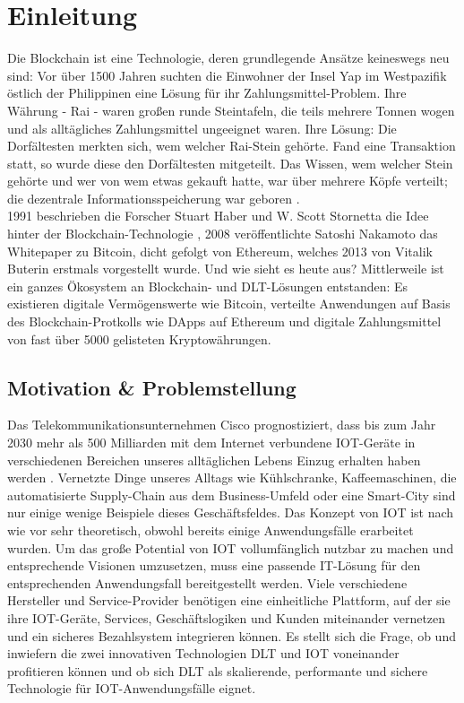 \chapter{Einleitung}
\label{ch:intro}
Die Blockchain ist eine Technologie, deren grundlegende Ansätze keineswegs neu sind: Vor über 1500 Jahren suchten die Einwohner der Insel Yap im Westpazifik östlich der Philippinen eine Lösung für ihr Zahlungsmittel-Problem. Ihre Währung - Rai - waren großen runde Steintafeln, die teils mehrere Tonnen wogen und als alltägliches Zahlungsmittel ungeeignet waren. Ihre Lösung: Die Dorfältesten merkten sich, wem welcher Rai-Stein gehörte. Fand eine Transaktion statt, so wurde diese den Dorfältesten mitgeteilt. Das Wissen, wem welcher Stein gehörte und wer von wem etwas gekauft hatte, war über mehrere Köpfe verteilt; die dezentrale Informationsspeicherung war geboren \cite{forbes2018}.\\
1991 beschrieben die Forscher Stuart Haber und W. Scott Stornetta die Idee hinter der Blockchain-Technologie \cite{binance2019}, 2008 veröffentlichte Satoshi Nakamoto das Whitepaper zu Bitcoin, dicht gefolgt von Ethereum, welches 2013 von Vitalik Buterin erstmals vorgestellt wurde. Und wie sieht es heute aus? Mittlerweile ist ein ganzes Ökosystem an Block\-chain- und \ac{DLT}-Lösungen entstanden: Es existieren digitale Vermögenswerte wie Bitcoin, verteilte Anwendungen auf Basis des Blockchain-Protkolls wie \ac{DApp}s auf Ethereum und digitale Zahlungsmittel von fast über 5000 gelisteten Kryptowährungen.\\


%
%
\section{Motivation \& Problemstellung}
\label{sec:intro:motivation}
Das Telekommunikationsunternehmen Cisco prognostiziert, dass bis zum Jahr 2030 mehr als 500 Milliarden mit dem Internet verbundene \ac{IOT}-Geräte in verschiedenen Bereichen unseres alltäglichen Lebens Einzug erhalten haben werden \cite{cisco2016}. Vernetzte Dinge unseres Alltags wie Kühlschranke, Kaffeemaschinen, die automatisierte Supply-Chain aus dem Business-Umfeld oder eine Smart-City sind nur einige wenige Beispiele dieses Geschäftsfeldes. Das Konzept von \ac{IOT} ist nach wie vor sehr theoretisch, obwohl bereits einige Anwendungsfälle erarbeitet wurden. Um das große Potential von \ac{IOT} vollumfänglich nutzbar zu machen und entsprechende Visionen umzusetzen, muss eine passende IT-Lösung für den entsprechenden Anwendungsfall bereitgestellt werden. Viele verschiedene Hersteller und Service-Provider benötigen eine einheitliche Plattform, auf der sie ihre \ac{IOT}-Geräte, Services, Geschäftslogiken und Kunden miteinander vernetzen und ein sicheres Bezahlsystem integrieren können. Es stellt sich die Frage, ob und inwiefern die zwei innovativen Technologien \ac{DLT} und \ac{IOT} voneinander profitieren können und ob sich \ac{DLT} als skalierende, performante und sichere Technologie für \ac{IOT}-Anwendungsfälle eignet.

